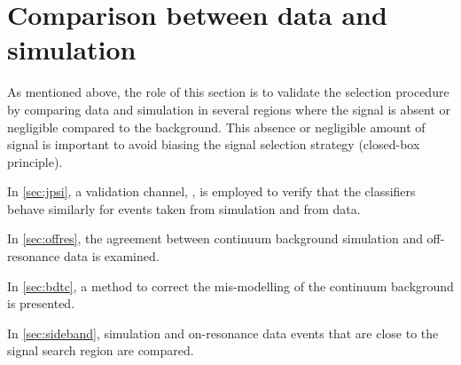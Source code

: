 \section{Comparison between data and simulation} \label{sec:data_mc}
As mentioned above, the role of this section is to validate the selection procedure by comparing data and simulation in several regions where the signal is absent or negligible compared to the background.
This absence or negligible amount of signal is important to avoid biasing the signal selection strategy (closed-box principle).
\bi
\item In \cref{sec:jpsi}, a validation channel, \BKjpsi, is employed to verify that the classifiers behave similarly for events taken from simulation and from data.
\item In \cref{sec:offres}, the agreement between continuum background simulation and off-resonance data is examined.
\item In \cref{sec:bdtc}, a method to correct the mis-modelling of the continuum background is presented.
\item In \cref{sec:sideband}, simulation and on-resonance data events that are close to the signal search region are compared.
\ei
